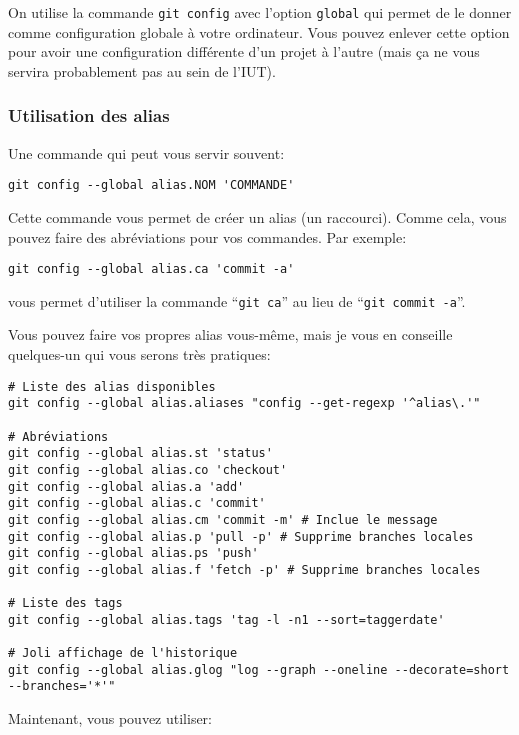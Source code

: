 \documentclass[10pt,a4paper]{article}
\begin{document}
On utilise la commande \texttt{git config} avec l'option {\tt global} qui permet de le donner comme configuration globale à votre ordinateur. Vous pouvez enlever cette option pour avoir une configuration différente d'un projet à l'autre (mais ça ne vous servira probablement pas au sein de l'IUT).

\subsubsection{Utilisation des alias\label{alias}}

Une commande qui peut vous servir souvent:

\begin{verbatim}
git config --global alias.NOM 'COMMANDE'
\end{verbatim}

Cette commande vous permet de créer un alias (un raccourci). Comme cela, vous pouvez faire des abréviations pour vos commandes. Par exemple:

\begin{verbatim}
git config --global alias.ca 'commit -a'
\end{verbatim}

vous permet d'utiliser la commande ``\texttt{git ca}'' au lieu de ``\texttt{git commit -a}''.

Vous pouvez faire vos propres alias vous-même, mais je vous en conseille quelques-un qui vous serons très pratiques:

\begin{verbatim}
# Liste des alias disponibles
git config --global alias.aliases "config --get-regexp '^alias\.'"

# Abréviations
git config --global alias.st 'status'
git config --global alias.co 'checkout'
git config --global alias.a 'add'
git config --global alias.c 'commit'
git config --global alias.cm 'commit -m' # Inclue le message
git config --global alias.p 'pull -p' # Supprime branches locales
git config --global alias.ps 'push'
git config --global alias.f 'fetch -p' # Supprime branches locales

# Liste des tags
git config --global alias.tags 'tag -l -n1 --sort=taggerdate'

# Joli affichage de l'historique
git config --global alias.glog "log --graph --oneline --decorate=short --branches='*'"
\end{verbatim}

Maintenant, vous pouvez utiliser:
\end{document}
